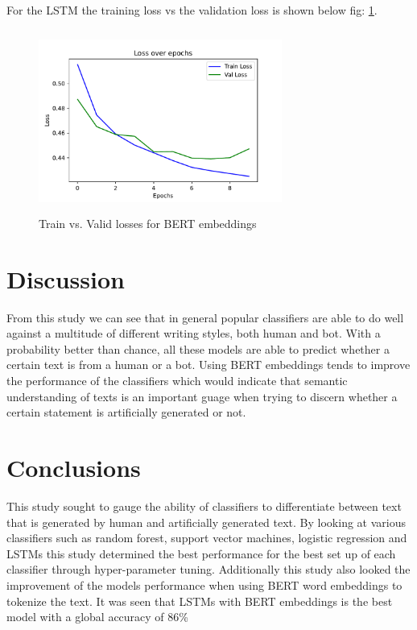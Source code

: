 \documentclass[12pt]{article}
\begin{document}
 For the LSTM the training loss vs the validation loss is shown below fig: \ref{fig:bert_loss}.
\begin{figure}[h!]
	\centering
	\caption{Train vs. Valid losses for BERT embeddings}
	\label{fig:bert_loss}
	\includegraphics[width=8cm, height=6cm]{bert_loss}
\end{figure}
\section{Discussion}
From this study we can see that in general popular classifiers are able to do well against a multitude of different writing styles, both human and bot. With a probability better than chance, all these models are able to predict whether a certain text is from a human or a bot. Using BERT embeddings tends to improve the performance of the classifiers which would indicate that semantic understanding of texts is an important guage when trying to discern whether a certain statement is artificially generated or not. 

\section{Conclusions}
This study sought to gauge the ability of classifiers to differentiate between text that is generated by human and artificially generated text. By looking at various classifiers such as random forest, support vector machines, logistic regression and LSTMs  this study determined the best performance for the best set up of each classifier through hyper-parameter tuning. Additionally this study also looked the improvement of the models performance when using BERT word embeddings to tokenize the text. It was seen that LSTMs with BERT embeddings is the best model with a global accuracy of 86\%  


\end{document}
